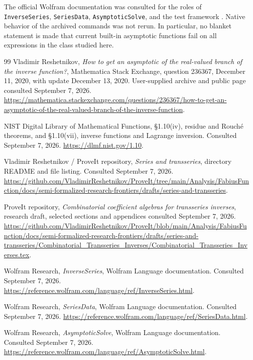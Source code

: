 \documentclass[11pt,a4paper]{article}
\theoremstyle{definition}
\theoremstyle{remark}
\newcommand{\code}[1]{\texttt{#1}}
\begin{document}
The official Wolfram documentation was consulted for the roles of
\code{InverseSeries}, \code{SeriesData}, \code{AsymptoticSolve}, and the test
framework \cite{inverseseries,seriesdata,asymptoticsolve,testreport,testreportobject,verificationtest}.
Native behavior of the archived commands was not rerun. In particular, no
blanket statement is made that current built-in asymptotic functions fail on
all expressions in the class studied here.

\clearpage
\begin{thebibliography}{99}
Vladimir Reshetnikov,
\emph{How to get an asymptotic of the real-valued branch of the inverse function?},
Mathematica Stack Exchange, question 236367, December 11, 2020, with update
December 13, 2020. User-supplied archive and public page consulted September 7, 2026.
\url{https://mathematica.stackexchange.com/questions/236367/how-to-get-an-asymptotic-of-the-real-valued-branch-of-the-inverse-function}.

NIST Digital Library of Mathematical Functions,
\S1.10(iv), residue and Rouch\'e theorems, and \S1.10(vii), inverse functions
and Lagrange inversion. Consulted September 7, 2026.
\url{https://dlmf.nist.gov/1.10}.

Vladimir Reshetnikov / ProveIt repository,
\emph{Series and transseries}, directory README and file listing.
Consulted September 7, 2026.
\url{https://github.com/VladimirReshetnikov/ProveIt/tree/main/Analysis/FabiusFunction/docs/semi-formalized-research-frontiers/drafts/series-and-transseries}.

ProveIt repository,
\emph{Combinatorial coefficient algebras for transseries inverses}, research
draft, selected sections and appendices consulted September 7, 2026.
\url{https://github.com/VladimirReshetnikov/ProveIt/blob/main/Analysis/FabiusFunction/docs/semi-formalized-research-frontiers/drafts/series-and-transseries/Combinatorial_Transseries_Inverses/Combinatorial_Transseries_Inverses.tex}.

Wolfram Research, \emph{InverseSeries}, Wolfram Language documentation.
Consulted September 7, 2026.
\url{https://reference.wolfram.com/language/ref/InverseSeries.html}.

Wolfram Research, \emph{SeriesData}, Wolfram Language documentation.
Consulted September 7, 2026.
\url{https://reference.wolfram.com/language/ref/SeriesData.html}.

Wolfram Research, \emph{AsymptoticSolve}, Wolfram Language documentation.
Consulted September 7, 2026.
\url{https://reference.wolfram.com/language/ref/AsymptoticSolve.html}.


\end{thebibliography}
\end{document}
